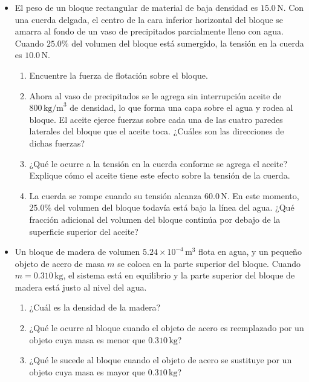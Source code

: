 \documentclass[11pt,a4paper]{article}
\begin{document}
\begin{itemize}
    \item[\textbf{14.}] El peso de un bloque rectangular de material de baja densidad es \(15.0\,\text{N}\). Con una cuerda delgada, el centro de la cara inferior horizontal del bloque se amarra al fondo de un vaso de precipitados parcialmente lleno con agua. Cuando \(25.0\%\) del volumen del bloque está sumergido, la tensión en la cuerda es \(10.0\,\text{N}\).
    \begin{enumerate}
        \item Encuentre la fuerza de flotación sobre el bloque.
        \item Ahora al vaso de precipitados se le agrega sin interrupción aceite de \(800\,\text{kg/m}^3\) de densidad, lo que forma una capa sobre el agua y rodea al bloque. El aceite ejerce fuerzas sobre cada una de las cuatro paredes laterales del bloque que el aceite toca. ¿Cuáles son las direcciones de dichas fuerzas?
        \item ¿Qué le ocurre a la tensión en la cuerda conforme se agrega el aceite? Explique cómo el aceite tiene este efecto sobre la tensión de la cuerda.
        \item La cuerda se rompe cuando su tensión alcanza \(60.0\,\text{N}\). En este momento, \(25.0\%\) del volumen del bloque todavía está bajo la línea del agua. ¿Qué fracción adicional del volumen del bloque continúa por debajo de la superficie superior del aceite?
    \end{enumerate}
    \vspace*{9cm}
    
    \item[\textbf{15.}] Un bloque de madera de volumen \(5.24 \times 10^{-4}\,\text{m}^3\) flota en agua, y un pequeño objeto de acero de masa \(m\) se coloca en la parte superior del bloque. Cuando \(m = 0.310\,\text{kg}\), el sistema está en equilibrio y la parte superior del bloque de madera está justo al nivel del agua.
    \begin{enumerate}
        \item ¿Cuál es la densidad de la madera?
        \item ¿Qué le ocurre al bloque cuando el objeto de acero es reemplazado por un objeto cuya masa es menor que \(0.310\,\text{kg}\)?
        \item ¿Qué le sucede al bloque cuando el objeto de acero se sustituye por un objeto cuya masa es mayor que \(0.310\,\text{kg}\)?
    \end{enumerate}
    \vspace*{7cm}
    

\end{itemize}
\end{document}
